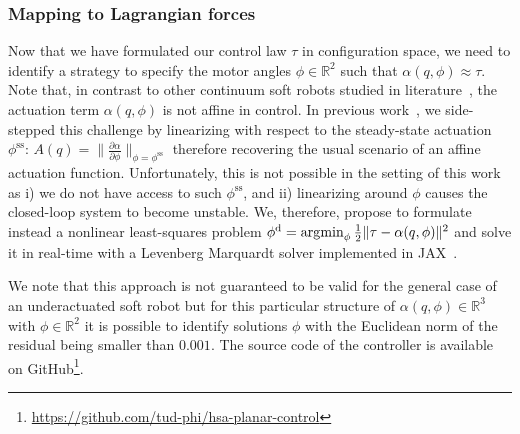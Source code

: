 \subsubsection{Mapping to Lagrangian forces}
%
Now that we have formulated our control law $\tau$ in configuration space, we need to identify a strategy to specify the motor angles $\phi \in \mathbb{R}^2$ such that $\alpha(q,\phi) \approx \tau$. Note that, in contrast to other continuum soft robots studied in literature~\cite{della2023model}, the actuation term $\alpha(q,\phi)$ is not affine in control. %
In previous work~\cite{stolzle2024experimental}, we side-stepped this challenge by linearizing with respect to the steady-state actuation $\phi^\mathrm{ss}$: $A(q) = \lVert \frac{\partial \alpha}{\partial \phi}\rVert_{\phi=\phi^\mathrm{ss}}$ therefore recovering the usual scenario of an affine actuation function. Unfortunately, this is not possible in the setting of this work as i) we do not have access to such $\phi^\mathrm{ss}$, and ii) linearizing around $\phi$ causes the closed-loop system to become unstable. We, therefore, propose to formulate instead a nonlinear least-squares problem $\phi^\mathrm{d} = \operatorname*{\arg\!\min}_\phi \frac{1}{2} \lVert \tau - \alpha(q,\phi) \rVert^2$ and solve it in real-time with a Levenberg Marquardt solver implemented in JAX~\cite{jaxopt_implicit_diff}.

We note that this approach is not guaranteed to be valid for the general case of an underactuated soft robot but for this particular structure of $\alpha(q,\phi) \in \mathbb{R}^3$ with $\phi \in \mathbb{R}^2$ it is possible to identify solutions $\phi$ with the Euclidean norm of the residual being smaller than $0.001$.
The source code of the controller is available on GitHub\footnote{\url{https://github.com/tud-phi/hsa-planar-control}}.
